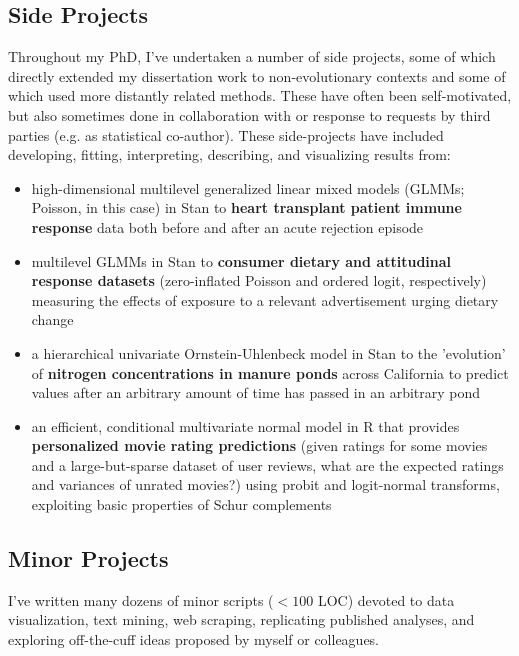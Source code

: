 \documentclass[12pt]{article}
\begin{document}
\subsection{Side Projects}

Throughout my PhD, I've undertaken a number of side projects, some of which directly extended my dissertation work to non-evolutionary contexts and some of which used more distantly related methods. These have often been self-motivated, but also sometimes done in collaboration with or response to requests by third parties (e.g. as statistical co-author). These side-projects have included developing, fitting,  interpreting, describing, and visualizing results from:

\begin{itemize}[noitemsep]

\item high-dimensional multilevel generalized linear mixed models (GLMMs; Poisson, in this case) in Stan to \textbf{heart transplant patient immune response} data both before and after an acute rejection episode
\item multilevel GLMMs in Stan to \textbf{consumer dietary and attitudinal response datasets} (zero-inflated Poisson and ordered logit, respectively) measuring the effects of exposure to a relevant advertisement urging dietary change
\item a hierarchical univariate Ornstein-Uhlenbeck model in Stan to the 'evolution' of \textbf{nitrogen concentrations in manure ponds} across California to predict values after an arbitrary amount of time has passed in an arbitrary pond
\item an efficient, conditional multivariate normal model in R that provides \textbf{personalized movie rating predictions} (given ratings for some movies and a large-but-sparse dataset of user reviews, what are the expected ratings and variances of unrated movies?) using probit and logit-normal transforms, exploiting basic properties of Schur complements

\end{itemize}

\subsection{Minor Projects}
I've written many dozens of minor scripts ($<100$ LOC) devoted to data visualization, text mining, web scraping, replicating published analyses, and exploring off-the-cuff ideas proposed by myself or colleagues.
\end{document}
